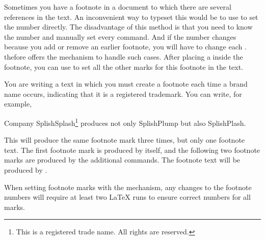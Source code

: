\begin{Declaration}
\end{Declaration}
Sometimes you have a footnote in a document to which there are several references
in the text. An inconvenient way to typeset this would be to use
 to set the number directly.
The disadvantage of this method is that you need to know the number and
manually set every  command.
And if the number changes because you add or remove an earlier footnote, you
will have to change each .
\KOMAScript{} thefore offers the %
 mechanism to handle such cases. After placing a
 inside the footnote, you can use  to set all the
other marks for this footnote in the text.
\IfThisCommonFirstRun{\iftrue}{\csname iffalse\endcsname}%
  \begin{Example}
    You are writing a text in which you must create a footnote each time a
    brand name occurs, indicating that it is a registered trademark. You can
    write, for example,
\begin{lstcode}
  Company SplishSplash\footnote{This is a registered trade name.
    All rights are reserved.\label{refnote}}
  produces not only SplishPlump
  but also SplishPlash.
\end{lstcode}
    This will produce the same footnote mark three times, but only one
    footnote text. The first footnote mark is produced by
     itself, and the following two
    footnote marks are produced by the additional 
    commands. The footnote text will be produced by
    .
  \end{Example}
\fi%
When setting footnote marks with the  mechanism, any
changes to the footnote numbers will require at least two \LaTeX{} runs to
ensure correct numbers for all  marks.%
%
